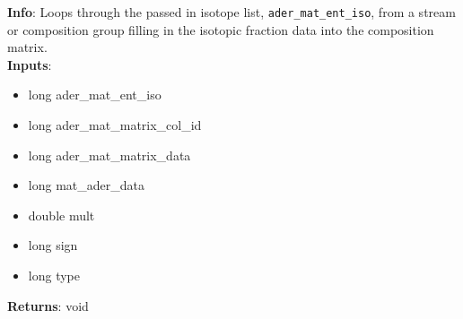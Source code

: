\textbf{Info}: Loops through the passed in isotope list,
\texttt{ader\_mat\_ent\_iso}, from a stream or composition group filling in the
isotopic fraction data into the composition matrix. \\

\noindent \textbf{Inputs}:
\begin{itemize}
\item{long ader\_mat\_ent\_iso}
\item{long ader\_mat\_matrix\_col\_id}
\item{long ader\_mat\_matrix\_data}
\item{long mat\_ader\_data}
\item{double mult}
\item{long sign}
\item{long type}
\end{itemize}

\noindent \textbf{Returns}: void
